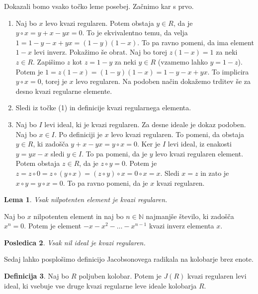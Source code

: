 \documentclass[a4paper, 12pt]{amsart}
\theoremstyle{definition} %
\newtheorem{definicija}{Definicija}[section]
\theoremstyle{plain} %
\newtheorem{lema}[definicija]{Lema}
\newtheorem{posledica}[definicija]{Posledica}
\newcommand{\N}{\mathbb N}
\begin{document}
\proof
Dokazali bomo vsako točko leme posebej. Začnimo kar s prvo.
\begin{enumerate}
\item Naj bo $x$ levo kvazi regularen. Potem obstaja $y\in R$, da je $y\circ x = y+x - yx = 0$. To je ekvivalentno temu, da velja $1 = 1 -y-x + yx = (1-y)(1-x)$. To pa ravno  pomeni, da ima element $1-x$ levi inverz. Pokažimo še obrat. Naj bo torej $z(1-x) = 1$ za neki $z\in R$. Zapišimo $z$ kot $z = 1 -y$ za neki $y\in R$ (vzamemo lahko $y = 1-z$). Potem je $1=z(1-x) = (1-y ) (1-x) = 1 - y -x +yx$. To implicira $y\circ x = 0$, torej je $x$ levo regularen. Na podoben način dokažemo trditev še za desno kvazi regularne elemente.

\item Sledi iz točke (1) in definicije kvazi regularnega elementa. 

\item Naj bo $I$ levi ideal, ki je kvazi regularen. Za desne ideale je dokaz podoben. Naj bo $x\in I$. Po definiciji je $x$ levo kvazi regularen. To pomeni, da obstaja $y\in R$, ki zadošča $y+x - yx = y\circ x = 0$. Ker je $I$ levi ideal, iz enakosti $y = yx - x$ sledi $y\in I$. To pa pomeni, da je $y$ levo kvazi regularen element. Potem obstaja $z \in R$, da je $z\circ y =0$. Potem je $z = z\circ 0 = z \circ (y \circ x) = (z\circ y) \circ x = 0 \circ x = x$. Sledi $x=z$ in zato je $x \circ y = y\circ x = 0$. To pa ravno pomeni, da je $x$ kvazi regularen.
\end{enumerate}
\endproof

\begin{lema}
Vsak nilpotenten element je kvazi regularen.
\end{lema}

\proof
Naj bo $x$ nilpotenten element in naj bo $n\in \N$ najmanjše število, ki zadošča $x^n=0$. Potem je element $-x-x^2 - \dots - x^{n-1}$ kvazi inverz elementa $x$.
\endproof

\begin{posledica}
Vsak nil ideal je kvazi regularen.
\end{posledica}

Sedaj lahko posplošimo definicijo Jacobsonovega radikala na kolobarje brez enote.

\begin{definicija}
Naj bo $R$ poljuben kolobar. Potem je $J(R)$ kvazi regularen levi ideal, ki vsebuje vse druge kvazi regularne leve ideale kolobarja $R$.
\end{definicija}
\end{document}
